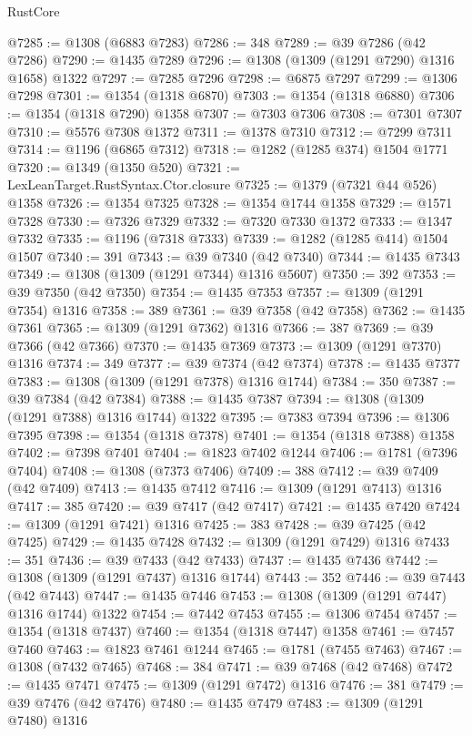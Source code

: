 \begin{lexlean}{RustCore}
\begin{coremodule}
@7285 := @1308 (@6883 @7283)
@7286 := 348
@7289 := @39 @7286 (@42 @7286)
@7290 := @1435 @7289
@7296 := @1308 (@1309 (@1291 @7290) @1316 @1658) @1322
@7297 := @7285 @7296
@7298 := @6875 @7297
@7299 := @1306 @7298
@7301 := @1354 (@1318 @6870)
@7303 := @1354 (@1318 @6880)
@7306 := @1354 (@1318 @7290) @1358
@7307 := @7303 @7306
@7308 := @7301 @7307
@7310 := @5576 @7308 @1372
@7311 := @1378 @7310
@7312 := @7299 @7311
@7314 := @1196 (@6865 @7312)
@7318 := @1282 (@1285 @374) @1504 @1771
@7320 := @1349 (@1350 @520)
@7321 := LexLeanTarget.RustSyntax.Ctor.closure
@7325 := @1379 (@7321 @44 @526) @1358
@7326 := @1354 @7325
@7328 := @1354 @1744 @1358
@7329 := @1571 @7328
@7330 := @7326 @7329
@7332 := @7320 @7330 @1372
@7333 := @1347 @7332
@7335 := @1196 (@7318 @7333)
@7339 := @1282 (@1285 @414) @1504 @1507
@7340 := 391
@7343 := @39 @7340 (@42 @7340)
@7344 := @1435 @7343
@7349 := @1308 (@1309 (@1291 @7344) @1316 @5607)
@7350 := 392
@7353 := @39 @7350 (@42 @7350)
@7354 := @1435 @7353
@7357 := @1309 (@1291 @7354) @1316
@7358 := 389
@7361 := @39 @7358 (@42 @7358)
@7362 := @1435 @7361
@7365 := @1309 (@1291 @7362) @1316
@7366 := 387
@7369 := @39 @7366 (@42 @7366)
@7370 := @1435 @7369
@7373 := @1309 (@1291 @7370) @1316
@7374 := 349
@7377 := @39 @7374 (@42 @7374)
@7378 := @1435 @7377
@7383 := @1308 (@1309 (@1291 @7378) @1316 @1744)
@7384 := 350
@7387 := @39 @7384 (@42 @7384)
@7388 := @1435 @7387
@7394 := @1308 (@1309 (@1291 @7388) @1316 @1744) @1322
@7395 := @7383 @7394
@7396 := @1306 @7395
@7398 := @1354 (@1318 @7378)
@7401 := @1354 (@1318 @7388) @1358
@7402 := @7398 @7401
@7404 := @1823 @7402 @1244
@7406 := @1781 (@7396 @7404)
@7408 := @1308 (@7373 @7406)
@7409 := 388
@7412 := @39 @7409 (@42 @7409)
@7413 := @1435 @7412
@7416 := @1309 (@1291 @7413) @1316
@7417 := 385
@7420 := @39 @7417 (@42 @7417)
@7421 := @1435 @7420
@7424 := @1309 (@1291 @7421) @1316
@7425 := 383
@7428 := @39 @7425 (@42 @7425)
@7429 := @1435 @7428
@7432 := @1309 (@1291 @7429) @1316
@7433 := 351
@7436 := @39 @7433 (@42 @7433)
@7437 := @1435 @7436
@7442 := @1308 (@1309 (@1291 @7437) @1316 @1744)
@7443 := 352
@7446 := @39 @7443 (@42 @7443)
@7447 := @1435 @7446
@7453 := @1308 (@1309 (@1291 @7447) @1316 @1744) @1322
@7454 := @7442 @7453
@7455 := @1306 @7454
@7457 := @1354 (@1318 @7437)
@7460 := @1354 (@1318 @7447) @1358
@7461 := @7457 @7460
@7463 := @1823 @7461 @1244
@7465 := @1781 (@7455 @7463)
@7467 := @1308 (@7432 @7465)
@7468 := 384
@7471 := @39 @7468 (@42 @7468)
@7472 := @1435 @7471
@7475 := @1309 (@1291 @7472) @1316
@7476 := 381
@7479 := @39 @7476 (@42 @7476)
@7480 := @1435 @7479
@7483 := @1309 (@1291 @7480) @1316

\end{coremodule}
\end{lexlean}
